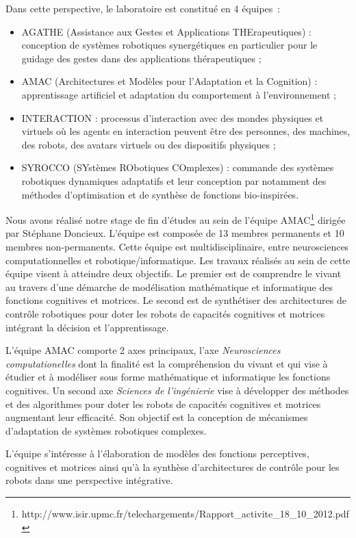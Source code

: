 \documentclass{llncs}
\begin{document}
Dans cette perspective, le laboratoire est constitué en 4 équipes~:

\begin{itemize}
\item AGATHE (Assistance aux Gestes et Applications THErapeutiques) : conception de systèmes robotiques synergétiques en particulier pour le guidage des gestes dans des applications thérapeutiques ;
\item AMAC (Architectures et Modèles pour l'Adaptation et la Cognition) : apprentissage artificiel et adaptation du comportement à l’environnement ;
\item INTERACTION : processus d’interaction avec des mondes physiques et virtuels où les agents en interaction peuvent être des personnes, des machines, des robots, des avatars virtuels ou des dispositifs physiques ;
\item SYROCCO (SYstèmes RObotiques COmplexes) : commande des systèmes robotiques dynamiques adaptatifs et leur conception par notamment des méthodes d’optimisation et de synthèse de fonctions bio-inspirées.
\end{itemize}

Nous avons réalisé notre stage de fin d'études au sein de l'équipe AMAC\footnote{http://www.isir.upmc.fr/telechargements/Rapport\_activite\_18\_10\_2012.pdf} dirigée par Stéphane Doncieux.
L'équipe est composée de 13 membres permanents et 10 membres non-permanents.
Cette équipe est multidisciplinaire, entre neurosciences computationnelles et robotique/informatique.
Les travaux réalisés au sein de cette équipe visent à atteindre deux objectifs.
Le premier est de comprendre le vivant au travers d’une démarche de modélisation mathématique et informatique des fonctions cognitives et motrices.
Le second est de synthétiser des architectures de contrôle robotiques pour doter les robots de capacités cognitives et motrices intégrant la décision et l’apprentissage.

L'équipe AMAC comporte 2 axes principaux, l'axe \textit{Neurosciences computationelles} dont la finalité est la compréhension du vivant et qui vise à étudier et à modéliser sous forme mathématique et informatique les fonctions cognitives.
Un second axe \textit{Sciences de l'ingénierie} vise à développer des méthodes et des algorithmes pour doter les robots de capacités cognitives et motrices augmentant leur efficacité. Son objectif est la conception de mécanismes d'adaptation de systèmes robotiques complexes.
 
L’équipe s’intéresse à l’élaboration de modèles des fonctions perceptives, cognitives et motrices ainsi qu’à la synthèse d’architectures de contrôle pour les robots dans une perspective intégrative.
\end{document}
